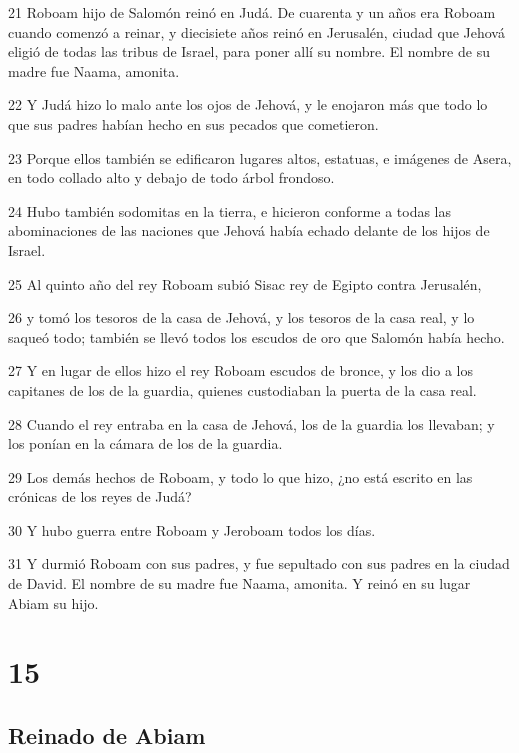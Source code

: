 \par 21 Roboam hijo de Salomón reinó en Judá. De cuarenta y un años era Roboam cuando comenzó a reinar, y diecisiete años reinó en Jerusalén, ciudad que Jehová eligió de todas las tribus de Israel, para poner allí su nombre. El nombre de su madre fue Naama, amonita.
\par 22 Y Judá hizo lo malo ante los ojos de Jehová, y le enojaron más que todo lo que sus padres habían hecho en sus pecados que cometieron.
\par 23 Porque ellos también se edificaron lugares altos, estatuas, e imágenes de Asera, en todo collado alto y debajo de todo árbol frondoso. 
\par 24 Hubo también sodomitas en la tierra, e hicieron conforme a todas las abominaciones de las naciones que Jehová había echado delante de los hijos de Israel.
\par 25 Al quinto año del rey Roboam subió Sisac rey de Egipto contra Jerusalén, 
\par 26 y tomó los tesoros de la casa de Jehová, y los tesoros de la casa real, y lo saqueó todo; también se llevó todos los escudos de oro que Salomón había hecho. 
\par 27 Y en lugar de ellos hizo el rey Roboam escudos de bronce, y los dio a los capitanes de los de la guardia, quienes custodiaban la puerta de la casa real.
\par 28 Cuando el rey entraba en la casa de Jehová, los de la guardia los llevaban; y los ponían en la cámara de los de la guardia.
\par 29 Los demás hechos de Roboam, y todo lo que hizo, ¿no está escrito en las crónicas de los reyes de Judá?
\par 30 Y hubo guerra entre Roboam y Jeroboam todos los días.
\par 31 Y durmió Roboam con sus padres, y fue sepultado con sus padres en la ciudad de David. El nombre de su madre fue Naama, amonita. Y reinó en su lugar Abiam su hijo.

\chapter{15}

\section*{Reinado de Abiam}

